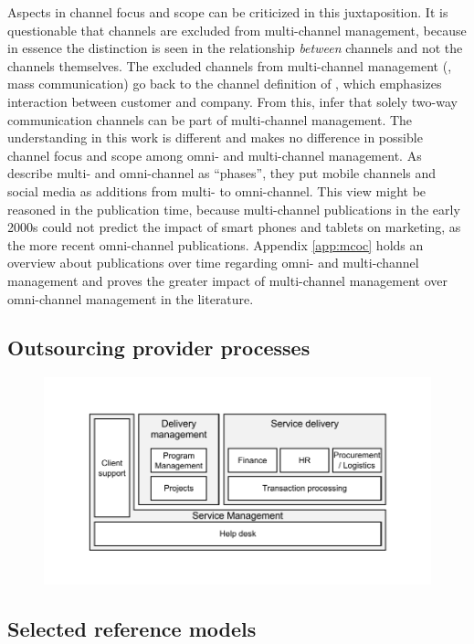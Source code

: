 Aspects in channel focus and scope can be criticized in this juxtaposition. It is questionable that channels are excluded from multi-channel management, because in essence the distinction is seen in the relationship \textit{between} channels and not the channels themselves. The excluded channels from multi-channel management (\viz, mass communication) go back to the channel definition of \cite{Neslin2006}, which emphasizes interaction between customer and company. From this, \citeauthor{vorhoef2015retail} infer that solely two-way communication channels can be part of multi-channel management. The understanding in this work is different and makes no difference in possible channel focus and scope among omni- and multi-channel management. As \citeauthor{vorhoef2015retail} describe multi- and omni-channel as \enquote{phases}, they put mobile channels and social media as additions from multi- to omni-channel. This view might be reasoned in the publication time, because multi-channel publications in the early 2000s could not predict the impact of smart phones and tablets on marketing, as the more recent omni-channel publications. Appendix \ref{app:mcoc} holds an overview about publications over time regarding omni- and multi-channel management and proves the greater impact of multi-channel management over omni-channel management in the literature. 


\subsection{Outsourcing provider processes}
\label{app:provproc}

		\begin{figure}[caption={Outsourcing provider processes}, label={fig:scheweproc}]
	{	\includegraphics[width=.8\textwidth]{figures/scheweproc.pdf}\\
		 } 
\end{figure}
\subsection{Selected reference models}

